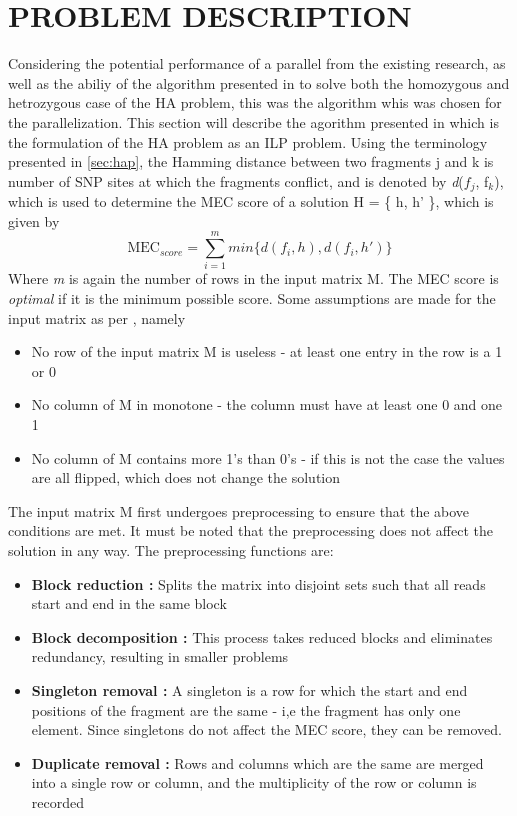 \documentclass[10pt,twocolumn]{witseiepaper}
\newcommand{\M}{\textit{m }}
\newcommand{\D}{\textit{d}}
\begin{document}

\section{ PROBLEM DESCRIPTION }

Considering the potential performance of a parallel from the existing research, as well as the abiliy of the
algorithm presented in \cite{chen:2013} to solve both the homozygous and hetrozygous case of the HA problem,
this was the algorithm whis was chosen for the parallelization. This section will describe the agorithm
presented in \cite{chen:2013} which is the formulation of the HA problem as an ILP problem. Using the
terminology presented in \ref{sec:hap}, the Hamming distance between two fragments j and k is number of SNP 
sites at which the fragments conflict, and is denoted by \D($f_j$, f$_k$), which is used to determine the
MEC score of a solution H = \{ h, h' \}, which is given by
\begin{equation}
    \textrm{MEC$_{score}$} = \sum_{i = 1}^{m}{ min\{ \D(f_i, h), \D(f_i, h') \} }
\end{equation}
Where \M is again the number of rows in the input matrix M. The MEC score is \textit{optimal} if it is the
minimum possible score. Some assumptions are made for the input matrix as per \cite{chen:2013}, namely
\begin{itemize}
    \item{ No row of the input matrix M is useless - at least one entry in the row is a 1 or 0 
    }
    \item{ No column of M in monotone - the column must have at least one 0 and one 1
    }
    \item{ No column of M contains more 1's than 0's - if this is not the case the values are all flipped, which
        does not change the solution
    }
\end{itemize}
The input matrix M first undergoes preprocessing to ensure that the above conditions are met. It must be noted
that the preprocessing does not affect the solution in any way. The preprocessing functions are:
\begin{itemize}
    \item{ \textbf{Block reduction :} Splits the matrix into disjoint sets such that all reads start and end
            in the same block
    }
    \item{ \textbf{Block decomposition :} This process takes reduced blocks and eliminates redundancy, resulting
        in smaller problems 
    }
    \item{ \textbf{Singleton removal :} A singleton is a row for which the start and end positions of the fragment
        are the same - i,e the fragment has only one element. Since singletons do not affect the MEC score,
        they can be removed.
    }
    \item{ \textbf{Duplicate removal :} Rows and columns which are the same are merged into a single row or
            column, and the multiplicity of the row or column is recorded
    }
\end{itemize}
\end{document}
